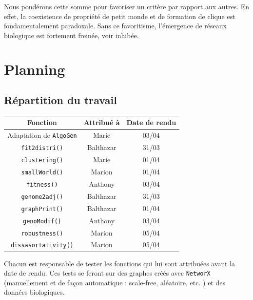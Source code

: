 \medskip
Nous pondérons cette somme pour favoriser un critère par rapport aux autres. En effet, la coexistence de propriété de petit monde et de formation de clique est fondamentalement paradoxale. Sans ce favoritisme, l'émergence de réseaux biologique est fortement freinée, voir inhibée.


\section{Planning}

\subsection{Répartition du travail}

\begin{center}
\begin{table}[!h]
\begin{tabular}{|c|c|c|}
\hline \textbf{Fonction} & \textbf{Attribué à} & \textbf{Date de rendu} \\
\hline
Adaptation de \verb?AlgoGen? & Marie & 03/04 \\
\hline
\verb?fit2distri()? & Balthazar & 31/03 \\
\hline
\verb?clustering()? & Marie & 01/04\\
\hline 
\verb?smallWorld()? & Marion & 01/04\\
\hline
\verb?fitness()? & Anthony & 03/04\\
\hline 
\verb?genome2adj()? & Balthazar & 31/03 \\
\hline 
\verb?graphPrint()? & Balthazar & 01/04 \\
\hline 
\verb?genoModif()? & Anthony & 03/04 \\
\hline 
\verb?robustness()? & Marion & 05/04 \\
\hline 
\verb?dissasortativity()? & Marion & 05/04\\
\hline 
\end{tabular}
\end{table}
\end{center}

Chacun est responsable de tester les fonctions qui lui sont attribuées avant la date de rendu. Ces tests se feront sur des graphes créés avec \verb?NetworX? (manuellement et de façon automatique : scale-free, aléatoire, etc. ) et des données biologiques.

